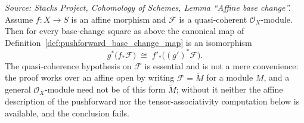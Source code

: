 \begin{lemma}
  \label{lem:affine_base_change_pushforward}
  \textit{Source: Stacks Project, Cohomology of Schemes, Lemma ``Affine base
  change''.}
  Assume \(f : X \to S\) is an affine morphism and \(\mathcal{F}\) is a
  quasi-coherent \(\mathcal{O}_X\)-module. Then for every base-change square as
  above the canonical map of
  Definition~\ref{def:pushforward_base_change_map} is an isomorphism
  \[
    g^*\bigl(f_*\mathcal{F}\bigr) \;\cong\; f'_*\bigl((g')^*\mathcal{F}\bigr).
  \]
  The quasi-coherence hypothesis on \(\mathcal{F}\) is essential and is not a mere
  convenience: the proof works over an affine open by writing
  \(\mathcal{F} = \widetilde{M}\) for a module \(M\), and a general
  \(\mathcal{O}_X\)-module need not be of this form
  \(\widetilde{M}\); without it neither the affine description of the pushforward
  nor the tensor-associativity computation below is available, and the conclusion
  fails.
\end{lemma}

